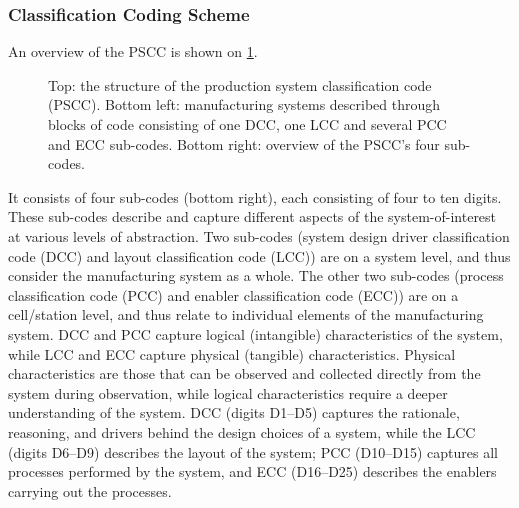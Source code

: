 \subsubsection*{Classification Coding Scheme}
An overview of the PSCC is shown on \cref{fig:PSCC_structure}.
\begin{figure}[tb]
  \centering
  \caption[Structure and overview of the production system classification code (PSCC).]
  {Top: the structure of the production system classification code (PSCC).
  Bottom left: manufacturing systems described through blocks of code consisting of one DCC, one LCC and several PCC and ECC sub-codes.
  Bottom right: overview of the PSCC's four sub-codes.}\label{fig:PSCC_structure}
\end{figure}
It consists of four sub-codes (bottom right), each consisting of four to ten digits. 
These sub-codes describe and capture different aspects of the system-of-interest at various levels of abstraction.
Two sub-codes (system design driver classification code (DCC) and layout classification code (LCC)) are on a system level, and thus consider the manufacturing system as a whole.
The other two sub-codes (process classification code (PCC) and enabler classification code (ECC)) are on a cell/station level, and thus relate to individual elements of the manufacturing system.
DCC and PCC capture logical (intangible) characteristics of the system, while LCC and ECC capture physical (tangible) characteristics.
Physical characteristics are those that can be observed and collected directly from the system during observation, while logical characteristics require a deeper understanding of the system.
DCC (digits D1--D5) captures the rationale, reasoning, and drivers behind the design choices of a system, while the LCC (digits D6--D9) describes the layout of the system; PCC (D10--D15) captures all processes performed by the system, and ECC (D16--D25) describes the enablers carrying out the processes.
